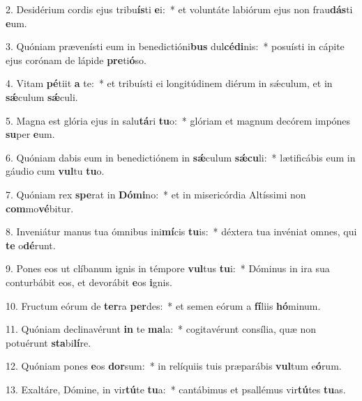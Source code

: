 2. Desidérium cordis ejus tribu\textbf{ís}ti \textbf{e}i:~*  et voluntáte labiórum ejus non frau\textbf{dás}ti \textbf{e}um.\

3. Quóniam prævenísti eum in benedictióni\textbf{bus} dul\textbf{cé}\textbf{di}nis:~*  posuísti in cápite ejus corónam de lápide \textbf{pre}ti\textbf{ó}so.\

4. Vitam \textbf{pé}tiit \textbf{a} te:~*  et tribuísti ei longitúdinem diérum in sǽculum, et in \textbf{sǽ}culum \textbf{sǽ}culi.\

5. Magna est glória ejus in salu\textbf{tá}ri \textbf{tu}o:~*  glóriam et magnum decórem impónes \textbf{su}per \textbf{e}um.\

6. Quóniam dabis eum in benedictiónem in \textbf{sǽ}culum \textbf{sǽ}\textbf{cu}li:~*  lætificábis eum in gáudio cum \textbf{vul}tu \textbf{tu}o.\

7. Quóniam rex \textbf{spe}rat in \textbf{Dó}\textbf{mi}no:~*  et in misericórdia Altíssimi non \textbf{com}mo\textbf{vé}bitur.\

8. Inveniátur manus tua ómnibus ini\textbf{mí}cis \textbf{tu}is:~*  déxtera tua invéniat omnes, qui \textbf{te} o\textbf{dé}runt.\

9. Pones eos ut clíbanum ignis in témpore \textbf{vul}tus \textbf{tu}i:~*  Dóminus in ira sua conturbábit eos, et devorábit \textbf{e}os \textbf{i}gnis.\

10. Fructum eórum de \textbf{ter}ra \textbf{per}des:~*  et semen eórum a \textbf{fí}liis \textbf{hó}minum.\

11. Quóniam declinavérunt \textbf{in} te \textbf{ma}la:~*  cogitavérunt consília, quæ non potuérunt \textbf{sta}bi\textbf{lí}re.\

12. Quóniam pones \textbf{e}os \textbf{dor}sum:~*  in relíquiis tuis præparábis \textbf{vul}tum e\textbf{ó}rum.\

13. Exaltáre, Dómine, in vir\textbf{tú}te \textbf{tu}a:~*  cantábimus et psallémus vir\textbf{tú}tes \textbf{tu}as.\

